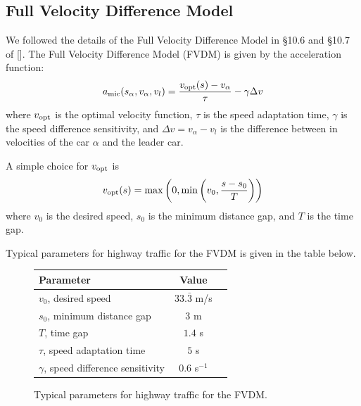 \documentclass[12pt]{article}
\begin{document}
    \subsection{Full Velocity Difference Model}\label{ch3.1}
    We followed the details of the Full Velocity Difference Model in \S 10.6 and \S 10.7 of [\cite{traffic}]. The Full Velocity Difference Model (FVDM) is given by the acceleration function: 
    \begin{equation}\label{a_mic}
      a_{\rm mic}(s_\alpha,v_\alpha,v_l) = \frac{v_{\rm opt} (s) - v_\alpha}{\tau} - \gamma \Delta v 
    \end{equation}
    where $v_{\rm opt}$ is the optimal velocity function, $\tau$ is the speed adaptation time, $\gamma$ is the speed difference sensitivity, and $\Delta v = v_\alpha - v_l$ is the difference between in velocities of the car $\alpha$ and the leader car.
    
    A simple choice for $v_{\rm opt}$ is 
    \begin{equation} 
      v_{\rm opt} (s) = \max \left( 0, \min \left( v_0, \frac{s-s_0}{T} \right) \right)
    \end{equation}
    where $v_0$ is the desired speed, $s_0$ is the minimum distance gap, and $T$ is the time gap. 

    Typical parameters for highway traffic for the FVDM is given in the table below. 
    \begin{figure}[H]
      \begin{center}
        \begin{tabular}{l c c } 
        Parameter & Value \\
        \hline
        $v_0$, desired speed & $33.\bar{3}$ m/s \\
        $s_0$, minimum distance gap & $3$ m \\
        $T$, time gap & $1.4$ s \\
        $\tau$, speed adaptation time & $5$ s \\
        $\gamma$, speed difference sensitivity & $0.6$ s$^{-1}$ \\
        \end{tabular}
        \end{center}
        \caption{Typical parameters for highway traffic for the FVDM.}
    \end{figure}
    
\end{document}
